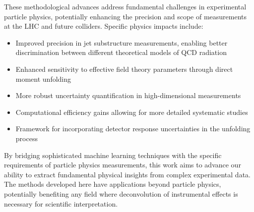 These methodological advances address fundamental challenges in experimental particle physics, potentially enhancing the precision and scope of measurements at the LHC and future colliders. Specific physics impacts include:

\begin{itemize}
\item Improved precision in jet substructure measurements, enabling better discrimination between different theoretical models of QCD radiation
\item Enhanced sensitivity to effective field theory parameters through direct moment unfolding
\item More robust uncertainty quantification in high-dimensional measurements
\item Computational efficiency gains allowing for more detailed systematic studies
\item Framework for incorporating detector response uncertainties in the unfolding process
\end{itemize}

By bridging sophisticated machine learning techniques with the specific requirements of particle physics measurements, this work aims to advance our ability to extract fundamental physical insights from complex experimental data. The methods developed here have applications beyond particle physics, potentially benefiting any field where deconvolution of instrumental effects is necessary for scientific interpretation.